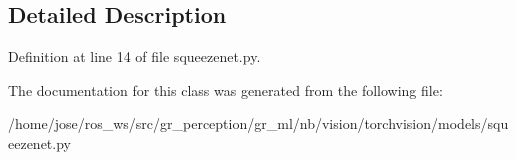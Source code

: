 \subsection{Detailed Description}


Definition at line 14 of file squeezenet.\+py.



The documentation for this class was generated from the following file\+:\begin{DoxyCompactItemize}
\item 
/home/jose/ros\+\_\+ws/src/gr\+\_\+perception/gr\+\_\+ml/nb/vision/torchvision/models/squeezenet.\+py\end{DoxyCompactItemize}
